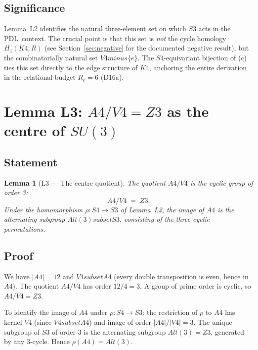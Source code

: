 \documentclass[11pt,a4paper]{article}
\def\Sfour{S4}%
\def\Vfour{V4}%
\def\Afour{A4}%
\def\Sthree{S3}%
\def\Zthree{Z3}%
\def\SUthree{SU(3)}%
\def\Kfour{K4}%
\def\Re{Re}%
\def\PDL{PDL}%
\def\cong{=}%
\def\setminus{ minus }%
\def\subset{ subset }%
\def\RR{R}%
\def\mathbb#1{#1}%
\def\mathrm#1{#1}%
\def\textsc#1{#1}%
\theoremstyle{plain}
\newtheorem{lemma}[theorem]{Lemma}
\theoremstyle{definition}
\theoremstyle{remark}
\newcommand{\PDL}{\textsc{PDL}}
\newcommand{\Kfour}{K_4}
\newcommand{\Sfour}{S_4}
\newcommand{\Afour}{A_4}
\newcommand{\Vfour}{V_4}
\newcommand{\Sthree}{S_3}
\newcommand{\Zthree}{\mathbb{Z}_3}
\newcommand{\SUthree}{\mathrm{SU}(3)}
\renewcommand{\Re}{R_e}
\newcommand{\RR}{\mathbb{R}}
\begin{document}
\subsection{Significance}

Lemma~L2 identifies the natural three-element set on which $\Sthree$ acts in the \PDL\ context. The crucial point is that this set is \emph{not} the cycle homology $H_1(\Kfour;\RR)$ (see Section~\ref{sec:negative} for the documented negative result), but the combinatorially natural set $\Vfour \setminus \{e\}$. The $\Sfour$-equivariant bijection of (c) ties this set directly to the edge structure of $\Kfour$, anchoring the entire derivation in the relational budget $\Re = 6$ (D16a).

\section{Lemma L3: \texorpdfstring{$\Afour/\Vfour \cong \Zthree$}{A4/V4 = Z3} as the centre of \texorpdfstring{$\SUthree$}{SU(3)}}
\label{sec:L3}

\subsection{Statement}

\begin{lemma}[L3 --- The centre quotient]
\label{lem:L3}
The quotient $\Afour/\Vfour$ is the cyclic group of order 3:
\[
\Afour/\Vfour \;\cong\; \Zthree.
\]
Under the homomorphism $\rho\colon \Sfour \to \Sthree$ of Lemma~L2, the image of $\Afour$ is the alternating subgroup $\mathrm{Alt}(3) \subset \Sthree$, consisting of the three cyclic permutations.
\end{lemma}

\subsection{Proof}

We have $|\Afour| = 12$ and $\Vfour \subset \Afour$ (every double transposition is even, hence in $\Afour$). The quotient $\Afour/\Vfour$ has order $12/4 = 3$. A group of prime order is cyclic, so $\Afour/\Vfour \cong \Zthree$.

To identify the image of $\Afour$ under $\rho\colon \Sfour \to \Sthree$: the restriction of $\rho$ to $\Afour$ has kernel $\Vfour$ (since $\Vfour \subset \Afour$) and image of order $|\Afour|/|\Vfour| = 3$. The unique subgroup of $\Sthree$ of order 3 is the alternating subgroup $\mathrm{Alt}(3) \cong \Zthree$, generated by any 3-cycle. Hence $\rho(\Afour) = \mathrm{Alt}(3)$.
\end{document}
